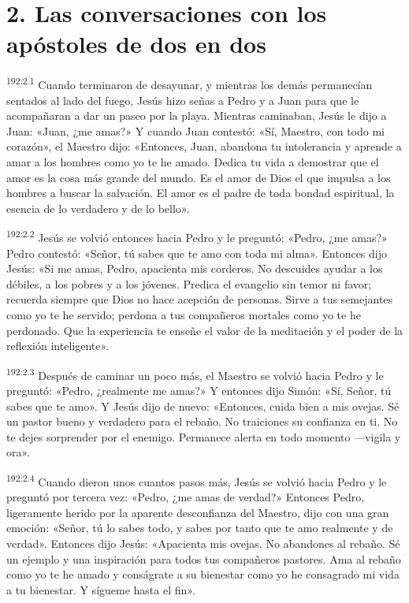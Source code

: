 \section*{2. Las conversaciones con los apóstoles de dos en dos}
\par 
\textsuperscript{192:2.1} Cuando terminaron de desayunar, y mientras los demás permanecían sentados al lado del fuego, Jesús hizo señas a Pedro y a Juan para que le acompañaran a dar un paseo por la playa. Mientras caminaban, Jesús le dijo a Juan: «Juan, ¿me amas?» Y cuando Juan contestó: «Sí, Maestro, con todo mi corazón», el Maestro dijo: «Entonces, Juan, abandona tu intolerancia y aprende a amar a los hombres como yo te he amado. Dedica tu vida a demostrar que el amor es la cosa más grande del mundo. Es el amor de Dios el que impulsa a los hombres a buscar la salvación. El amor es el padre de toda bondad espiritual, la esencia de lo verdadero y de lo bello».

\par 
\textsuperscript{192:2.2} Jesús se volvió entonces hacia Pedro y le preguntó: «Pedro, ¿me amas?» Pedro contestó: «Señor, tú sabes que te amo con toda mi alma». Entonces dijo Jesús: «Si me amas, Pedro, apacienta mis corderos. No descuides ayudar a los débiles, a los pobres y a los jóvenes. Predica el evangelio sin temor ni favor; recuerda siempre que Dios no hace acepción de personas. Sirve a tus semejantes como yo te he servido; perdona a tus compañeros mortales como yo te he perdonado. Que la experiencia te enseñe el valor de la meditación y el poder de la reflexión inteligente».

\par 
\textsuperscript{192:2.3} Después de caminar un poco más, el Maestro se volvió hacia Pedro y le preguntó: «Pedro, ¿realmente me amas?» Y entonces dijo Simón: «Sí, Señor, tú sabes que te amo». Y Jesús dijo de nuevo: «Entonces, cuida bien a mis ovejas. Sé un pastor bueno y verdadero para el rebaño. No traiciones su confianza en ti. No te dejes sorprender por el enemigo. Permanece alerta en todo momento ---vigila y ora».

\par 
\textsuperscript{192:2.4} Cuando dieron unos cuantos pasos más, Jesús se volvió hacia Pedro y le preguntó por tercera vez: «Pedro, ¿me amas de verdad?» Entonces Pedro, ligeramente herido por la aparente desconfianza del Maestro, dijo con una gran emoción: «Señor, tú lo sabes todo, y sabes por tanto que te amo realmente y de verdad». Entonces dijo Jesús: «Apacienta mis ovejas. No abandones al rebaño. Sé un ejemplo y una inspiración para todos tus compañeros pastores. Ama al rebaño como yo te he amado y conságrate a su bienestar como yo he consagrado mi vida a tu bienestar. Y sígueme hasta el fin».

